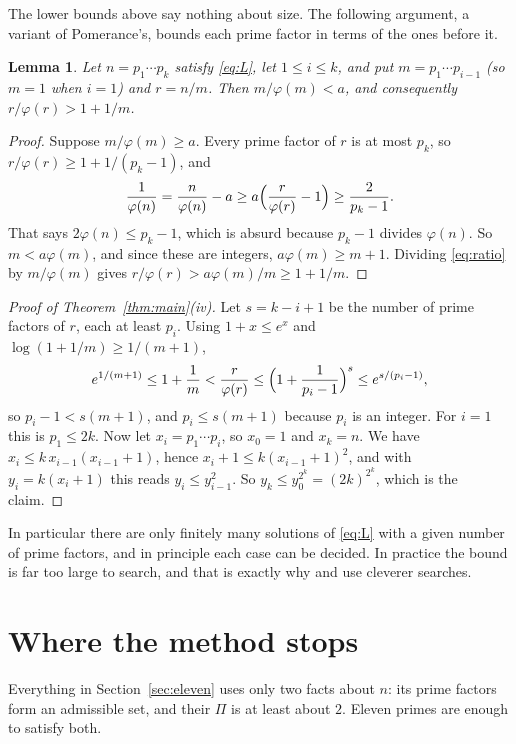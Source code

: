 \documentclass[11pt]{amsart}
\newtheorem{lemma}[theorem]{Lemma}
\theoremstyle{definition}
\theoremstyle{remark}
\begin{document}
The lower bounds above say nothing about size. The following argument,
a variant of Pomerance's, bounds each prime factor in terms of the ones
before it.

\begin{lemma}\label{lem:prefix}
Let $n=p_1\cdots p_k$ satisfy \eqref{eq:L}, let $1\le i\le k$, and put
$m=p_1\cdots p_{i-1}$ (so $m=1$ when $i=1$) and $r=n/m$. Then
$m/\varphi(m)<a$, and consequently $r/\varphi(r)>1+1/m$.
\end{lemma}

\begin{proof}
Suppose $m/\varphi(m)\ge a$. Every prime factor of $r$ is at most $p_k$,
so $r/\varphi(r)\ge1+1/(p_k-1)$, and
\[
  \frac1{\varphi(n)}=\frac{n}{\varphi(n)}-a\ge a\Bigl(\frac{r}{\varphi(r)}-1\Bigr)
  \ge\frac{2}{p_k-1}.
\]
That says $2\varphi(n)\le p_k-1$, which is absurd because $p_k-1$
divides $\varphi(n)$. So $m<a\varphi(m)$, and since these are integers,
$a\varphi(m)\ge m+1$. Dividing \eqref{eq:ratio} by $m/\varphi(m)$ gives
$r/\varphi(r)>a\varphi(m)/m\ge1+1/m$.
\end{proof}

\begin{proof}[Proof of Theorem~\ref{thm:main}(iv)]
Let $s=k-i+1$ be the number of prime factors of $r$, each at least
$p_i$. Using $1+x\le e^{x}$ and $\log(1+1/m)\ge1/(m+1)$,
\[
  e^{1/(m+1)}\le1+\frac1m<\frac{r}{\varphi(r)}\le\Bigl(1+\frac1{p_i-1}\Bigr)^{s}
  \le e^{s/(p_i-1)},
\]
so $p_i-1<s(m+1)$, and $p_i\le s(m+1)$ because $p_i$ is an integer. For
$i=1$ this is $p_1\le2k$. Now let $x_i=p_1\cdots p_i$, so $x_0=1$ and
$x_k=n$. We have $x_i\le k\,x_{i-1}(x_{i-1}+1)$, hence
$x_i+1\le k(x_{i-1}+1)^2$, and with $y_i=k(x_i+1)$ this reads
$y_i\le y_{i-1}^2$. So $y_k\le y_0^{2^{k}}=(2k)^{2^{k}}$, which is the
claim.
\end{proof}

In particular there are only finitely many solutions of \eqref{eq:L}
with a given number of prime factors, and in principle each case can be
decided. In practice the bound is far too large to search, and that is
exactly why \cite{CH80} and \cite{MBB} use cleverer searches.

\section{Where the method stops}\label{sec:limit}

Everything in Section~\ref{sec:eleven} uses only two facts about $n$:
its prime factors form an admissible set, and their $\Pi$ is at least
about $2$. Eleven primes are enough to satisfy both.
\end{document}
